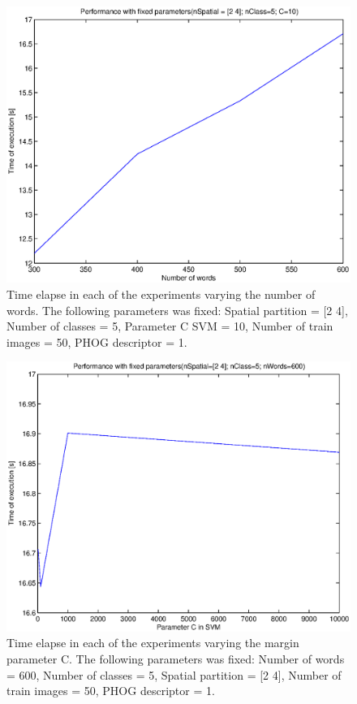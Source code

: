 \documentclass[10pt,twocolumn,letterpaper]{article}
\begin{document}
\begin{figure}[h]
\begin{center}
\includegraphics[width=1\linewidth]{images/nWords2.eps}
\end{center}
   \caption{
Time elapse in each of the experiments varying the number of words. The following parameters was fixed: Spatial partition = [2 4], Number of classes = 5, Parameter C SVM = 10, Number of train images = 50, PHOG descriptor = 1.
   }
\label{nWords2}
\end{figure}

\begin{figure}[h]
\begin{center}
\includegraphics[width=1\linewidth]{images/C2.eps}
\end{center}
   \caption{
Time elapse in each of the experiments varying the margin parameter C. The following parameters was fixed: Number of words = 600, Number of classes = 5, Spatial partition = [2 4], Number of train images = 50, PHOG descriptor = 1.
   }
\label{C2}
\end{figure}
\end{document}
